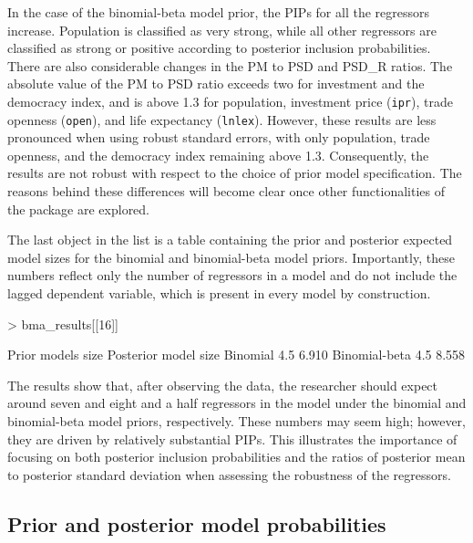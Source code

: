 \documentclass[a4paper]{article}
\begin{document}
In the case of the binomial-beta model prior, the PIPs for all the regressors increase.
Population is classified as very strong, while all other regressors are classified as strong or positive according to posterior inclusion probabilities.
There are also considerable changes in the PM to PSD and PSD\_R ratios.
The absolute value of the PM to PSD ratio exceeds two for investment and the democracy index, and is above 1.3 for population, investment price (\verb+ipr+), trade openness (\verb+open+), and life expectancy (\verb+lnlex+).
However, these results are less pronounced when using robust standard errors, with only population, trade openness, and the democracy index remaining above 1.3.
Consequently, the results are not robust with respect to the choice of prior model specification.
The reasons behind these differences will become clear once other functionalities of the package are explored.

The last object in the list is a table containing the prior and posterior expected model sizes for the binomial and binomial-beta model priors.
Importantly, these numbers reflect only the number of regressors in a model and do not include the lagged dependent variable, which is present in every model by construction.

\begin{Schunk}
\begin{Sinput}
> bma_results[[16]]
\end{Sinput}
\begin{Soutput}
              Prior models size Posterior model size
Binomial                    4.5                6.910
Binomial-beta               4.5                8.558
\end{Soutput}
\end{Schunk}

The results show that, after observing the data, the researcher should expect around seven and eight and a half regressors in the model under the binomial and binomial-beta model priors, respectively.
These numbers may seem high; however, they are driven by relatively substantial PIPs.
This illustrates the importance of focusing on both posterior inclusion probabilities and the ratios of posterior mean to posterior standard deviation when assessing the robustness of the regressors.

\subsection{Prior and posterior model probabilities}
\end{document}
